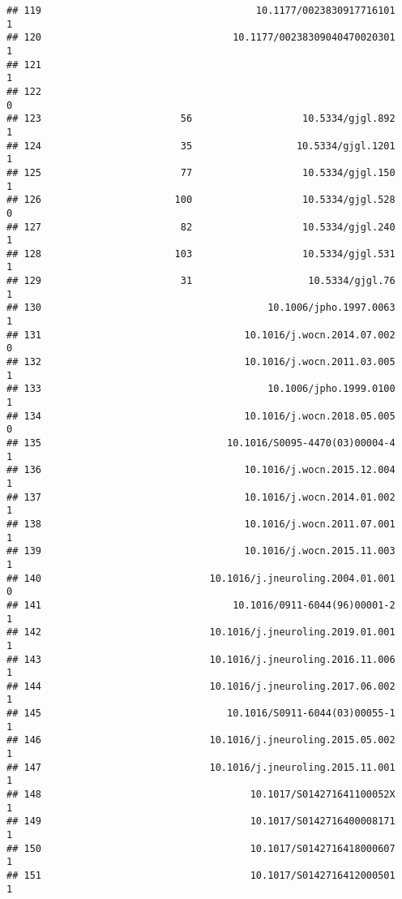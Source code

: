 \documentclass[
  english,
  man]{apa6}
\begin{document}
\begin{verbatim}
## 119                                     10.1177/0023830917716101            1
## 120                                 10.1177/00238309040470020301            1
## 121                                                                         1
## 122                                                                         0
## 123                        56                   10.5334/gjgl.892            1
## 124                        35                  10.5334/gjgl.1201            1
## 125                        77                   10.5334/gjgl.150            1
## 126                       100                   10.5334/gjgl.528            0
## 127                        82                   10.5334/gjgl.240            1
## 128                       103                   10.5334/gjgl.531            1
## 129                        31                    10.5334/gjgl.76            1
## 130                                       10.1006/jpho.1997.0063            1
## 131                                   10.1016/j.wocn.2014.07.002            0
## 132                                   10.1016/j.wocn.2011.03.005            1
## 133                                       10.1006/jpho.1999.0100            1
## 134                                   10.1016/j.wocn.2018.05.005            0
## 135                                10.1016/S0095-4470(03)00004-4            1
## 136                                   10.1016/j.wocn.2015.12.004            1
## 137                                   10.1016/j.wocn.2014.01.002            1
## 138                                   10.1016/j.wocn.2011.07.001            1
## 139                                   10.1016/j.wocn.2015.11.003            1
## 140                             10.1016/j.jneuroling.2004.01.001            0
## 141                                 10.1016/0911-6044(96)00001-2            1
## 142                             10.1016/j.jneuroling.2019.01.001            1
## 143                             10.1016/j.jneuroling.2016.11.006            1
## 144                             10.1016/j.jneuroling.2017.06.002            1
## 145                                10.1016/S0911-6044(03)00055-1            1
## 146                             10.1016/j.jneuroling.2015.05.002            1
## 147                             10.1016/j.jneuroling.2015.11.001            1
## 148                                    10.1017/S014271641100052X            1
## 149                                    10.1017/S0142716400008171            1
## 150                                    10.1017/S0142716418000607            1
## 151                                    10.1017/S0142716412000501            1

\end{verbatim}
\end{document}
